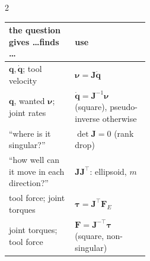 \begin{multicols}{2}
\begin{fbx}
\begin{tabularx}{\linewidth}{@{}>{\raggedright\arraybackslash}p{0.47\linewidth}X@{}}
\toprule the question gives \ldots finds \ldots & use\\\midrule
$\mathbf q,\dot{\mathbf q}$; tool velocity & $\boldsymbol\nu=\mathbf J\dot{\mathbf q}$\\
$\mathbf q$, wanted $\boldsymbol\nu$; joint rates & $\dot{\mathbf q}=\mathbf J^{-1}\boldsymbol\nu$ (square), pseudo-inverse otherwise\\
``where is it singular?'' & $\det\mathbf J=0$ (rank drop)\\
``how well can it move in each direction?'' & $\mathbf J\mathbf J^\top$: ellipsoid, $m$\\
tool force; joint torques & $\boldsymbol\tau=\mathbf J^\top\mathbf F_E$\\
joint torques; tool force & $\mathbf F=\mathbf J^{-\top}\boldsymbol\tau$ (square, non-singular)\\
\bottomrule
\end{tabularx}
\end{fbx}


\end{multicols}
